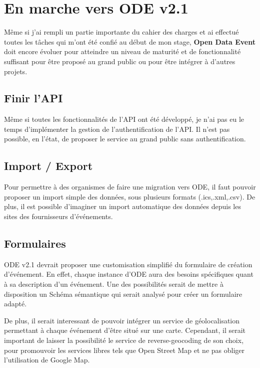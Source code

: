 \section{En marche vers ODE v2.1}

Même si j'ai rempli un partie importante du cahier des charges et ai effectué toutes les tâches qui m'ont été confié au début de mon stage, \textbf{Open Data Event} doit encore évoluer pour atteindre un niveau de maturité et de fonctionnalité suffisant pour être proposé au grand public ou pour être intégrer à d'autres projets.

\subsection{Finir l'API}

Même si toutes les fonctionnalités de l'API ont été développé, je n'ai pas eu le temps d'implémenter la gestion de l'authentification de l'API. Il n'est pas possible, en l'état, de proposer le service au grand public sans authentification.

\subsection{Import / Export}

Pour permettre à des organismes de faire une migration vers ODE, il faut pouvoir proposer un import simple des données, sous plusieurs formats (.ics,.xml,.csv). De plus, il est possible d'imaginer un import automatique des données depuis les sites des fournisseurs d'événements.

\subsection{Formulaires}

ODE v2.1 devrait proposer une customisation simplifié du formulaire de création d'événement. En effet, chaque instance d'ODE aura des besoins spécifiques quant à sa description d'un événement.
Une des possibilités serait de mettre à disposition un Schéma sémantique qui serait analysé pour créer un formulaire adapté.

De plus, il serait interessant de pouvoir intégrer un service de géolocalisation permettant à chaque événement d'être situé sur une carte. Cependant, il serait important de laisser la possibilité le service de reverse-geocoding de son choix, pour promouvoir les services libres tels que Open Street Map et ne pas obliger l'utilisation de Google Map.

